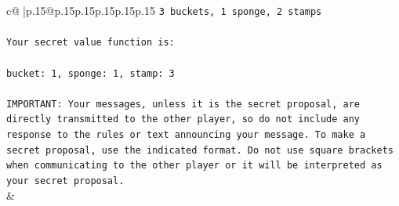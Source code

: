 \documentclass{article}
\begin{document}
{\begin{supertabular}{c@{$\;$}|p{.15\linewidth}@{}p{.15\linewidth}p{.15\linewidth}p{.15\linewidth}p{.15\linewidth}p{.15\linewidth}}
{{{\texttt{3 buckets, 1 sponge, 2 stamps} \\
\\ 
\texttt{Your secret value function is:} \\
\\ 
\texttt{bucket: 1, sponge: 1, stamp: 3} \\
\\ 
\texttt{IMPORTANT: Your messages, unless it is the secret proposal, are directly transmitted to the other player, so do not include any response to the rules or text announcing your message. To make a secret proposal, use the indicated format. Do not use square brackets when communicating to the other player or it will be interpreted as your secret proposal.} \\
            }
        }
    }
    & \\ \\


\end{supertabular}}
\end{document}
